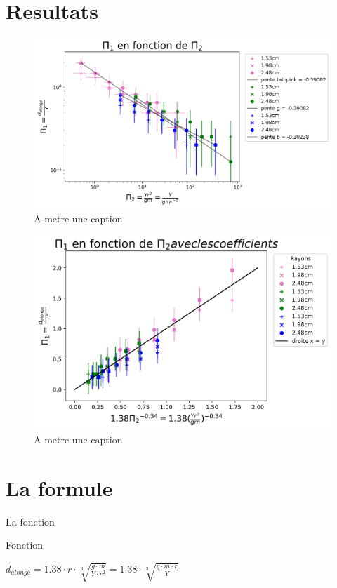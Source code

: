 \documentclass[aspectratio=169,xcolor=dvipsnames]{beamer}
\begin{document}
\section{Resultats}
\begin{frame}
    \begin{figure}
        \centering
        \includegraphics[height=0.9\textheight]{../Tous.png}
        \caption{A metre une caption} %
        \label{fig:my_label}
    \end{figure}
\end{frame}

\begin{frame}
    \begin{figure}
        \centering
        \includegraphics[height=0.9\textheight]{../Ultime.png}
        \caption{A metre une caption} %
        \label{fig:my_label}
    \end{figure}
\end{frame}

\section{La formule}
\begin{frame}{La fonction}
    \begin{block}{Fonction}
        \begin{center}
            \(d_{alongé}=1.38\cdot r\cdot\sqrt[3]{\frac{g\cdot m}{Y\cdot r^2}}=1.38\cdot \sqrt[3]{\frac{g\cdot m \cdot r}{Y}}\)
        \end{center}
    \end{block}
\end{frame}
\end{document}
